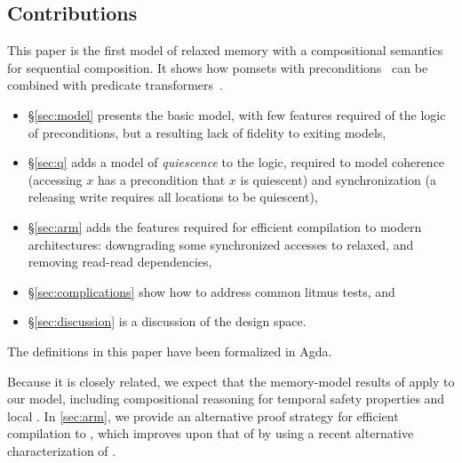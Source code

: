 \subsection{Contributions}

This paper is the first model of relaxed memory with a compositional
semantics for sequential composition.  It shows how pomsets with
preconditions~\cite{DBLP:journals/pacmpl/JagadeesanJR20} can be combined
with predicate transformers~\cite{DBLP:journals/cacm/Dijkstra75}.
\begin{itemize}
\item \S\ref{sec:model} presents the basic model, with few features
  required of the logic of preconditions, but a resulting lack of fidelity
  to exiting models,
\item \S\ref{sec:q} adds a model of \emph{quiescence} to the logic,
  required to model coherence (accessing $x$ has a precondition that $x$ is quiescent)
  and synchronization (a releasing write requires all locations to be quiescent),
\item \S\ref{sec:arm} adds the features required for efficient compilation
  to modern architectures: downgrading some synchronized accesses to relaxed,
  and removing read-read dependencies,
\item \S\ref{sec:complications} show how to address common litmus tests, and
\item \S\ref{sec:discussion} is a discussion of the design space.
\end{itemize}
The definitions in this paper have been formalized in Agda.

Because it is closely related, we expect that the memory-model results of
\cite{DBLP:journals/pacmpl/JagadeesanJR20} apply to our model, including
compositional reasoning for temporal safety properties and {local} \drfsc.
In \textsection\ref{sec:arm}, we provide an alternative proof strategy for
efficient compilation to \armeight{}, which improves upon that of
\cite{DBLP:journals/pacmpl/JagadeesanJR20} by using a recent alternative
characterization of \armeight{}.



